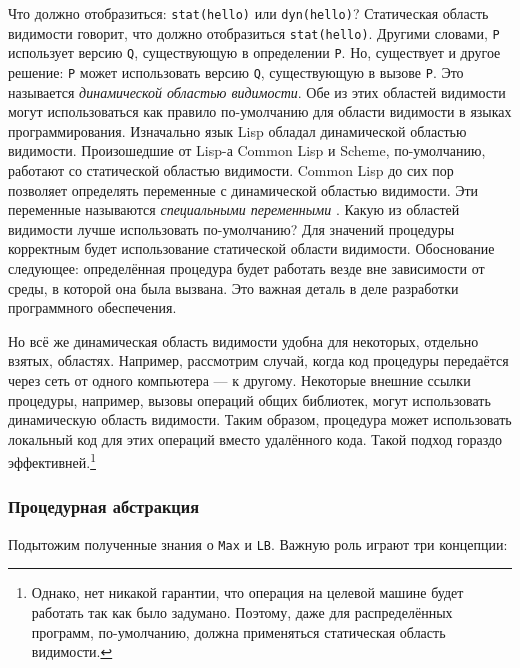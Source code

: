 Что должно отобразиться: \lstinline|stat(hello)| или \lstinline|dyn(hello)|? Статическая область видимости говорит, что должно отобразиться \lstinline|stat(hello)|. Другими словами, \lstinline|P| использует версию \lstinline|Q|, существующую в определении \lstinline|P|. Но, существует и другое решение: \lstinline|P| может использовать версию \lstinline|Q|, существующую в вызове \lstinline|P|. Это называется \emph{динамической областью видимости}. Обе из этих областей видимости могут использоваться как правило по-умолчанию для области видимости в языках программирования. Изначально язык Lisp обладал динамической областью видимости. Произошедшие от Lisp-а Common Lisp и Scheme, по-умолчанию, работают со статической областью видимости. Common Lisp до сих пор позволяет определять переменные с динамической областью видимости. Эти переменные называются \emph{специальными переменными} \cite{181}. Какую из областей видимости лучше использовать по-умолчанию? Для значений процедуры корректным будет использование статической области видимости. Обоснование следующее: определённая процедура будет работать везде вне зависимости от среды, в которой она была вызвана. Это важная деталь в деле разработки программного обеспечения.

Но всё же динамическая область видимости удобна для некоторых, отдельно взятых, областях. Например, рассмотрим случай, когда код процедуры передаётся через сеть от одного компьютера --- к другому. Некоторые внешние ссылки процедуры, например, вызовы операций общих библиотек, могут использовать динамическую область видимости. Таким образом, процедура может использовать локальный код для этих операций вместо удалённого кода. Такой подход гораздо эффективней.\footnote{Однако, нет никакой гарантии, что операция на целевой машине будет работать так как было задумано. Поэтому, даже для распределённых программ, по-умолчанию, должна применяться статическая область видимости.}

\subsubsection{Процедурная абстракция}

Подытожим полученные знания о \lstinline|Max| и \lstinline|LB|. Важную роль играют три концепции:


